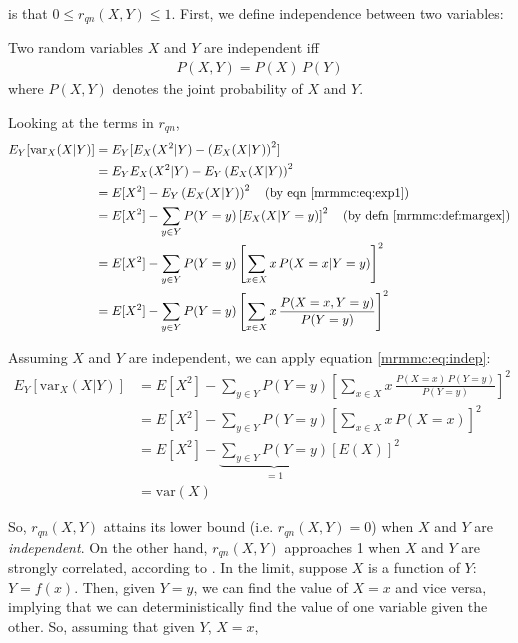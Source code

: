 \documentclass[12pt, twoside, a4paper]{report}
\def\var{\text{var}}
\begin{document}
is that $0 \leq r_{qn}(X, Y) \leq 1$. First, we define independence between two variables:\\

\begin{mydef}
Two random variables $X$ and $Y$ are independent iff
\begin{align}
P(X, Y) = P(X) \, P(Y) \label{mrmmc:eq:indep}
\end{align}
where $P(X, Y)$ denotes the joint probability of $X$ and $Y$.
\end{mydef}

Looking at the terms in $r_{qn}$,
\begin{align*}
E_Y[\var_X(X|Y)]
&= E_Y [E_X(X^2|Y)-\left( E_X(X|Y) \right)^2 ] \\
&= E_YE_X(X^2|Y) - E_Y\left( E_X(X|Y) \right)^2 \\
&= E[X^2] - E_Y\left( E_X(X|Y) \right)^2 \quad \text{(by eqn \ref{mrmmc:eq:exp1})} \\
&= E[X^2] - \sum_{y\in Y} P(Y=y) \left[ E_X(X|Y=y) \right]^2 \quad \text{(by defn \ref{mrmmc:def:margex})} \\
&= E[X^2] - \sum_{y\in Y} P(Y=y) \left[ \sum_{x \in X} x \, P(X=x|Y=y) \right]^2 \\
&= E[X^2] - \sum_{y\in Y} P(Y=y) \left[ \sum_{x \in X} x \, \frac{P(X=x, Y=y)}{P(Y=y)} \right]^2
\end{align*}

Assuming $X$ and $Y$ are independent, we can apply equation \ref{mrmmc:eq:indep}:
\begin{align*}
E_Y[\var_X(X|Y)]
&= E[X^2] - \sum_{y\in Y} P(Y=y) \left[ \sum_{x \in X} x \, \frac{P(X=x) \, P(Y=y)}{P(Y=y)} \right]^2 \\
&= E[X^2] - \sum_{y\in Y} P(Y=y) \left[ \sum_{x \in X} x \, P(X=x) \right]^2 \\
&= E[X^2] - \underbrace{\sum_{y\in Y} P(Y=y)}_{=1} \left[ E(X) \right]^2 \\
&= \var(X)
\end{align*}

So, $r_{qn}(X, Y)$ attains its lower bound (i.e. $r_{qn}(X, Y)=0$) when $X$ and $Y$ are \textit{independent}. On the other hand, $r_{qn}(X, Y)$ approaches 1 when $X$ and $Y$ are strongly correlated, according to \cite{RefWorks:187}. In the limit, suppose $X$ is a function of $Y$: $Y=f(x)$. Then, given $Y=y$, we can find the value of $X=x$ and vice versa, implying that we can deterministically find the value of one variable given the other. So, assuming that given $Y$, $X=x$,
\end{document}
